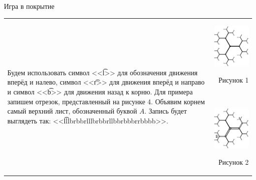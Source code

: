\begin{problem}{Игра в покрытие}
\begin{tabular}{lr}
\begin{minipage}{0.70\thelinewidth}
Будем использовать символ <<\t{l}>> для обозначения движения вперёд и налево,
символ <<\t{r}>> для движения вперёд и направо и
символ <<\t{b}>> для движения назад к корню.
Для примера запишем отрезок, представленный на рисунке 4.
Объявим корнем самый верхний лист, обозначенный буквой $A$.
Запись будет выглядеть так: <<\t{lllbrbbrlllbrbbrllbbrbbbrrbbbb}>>.
\end{minipage}
&
\begin{minipage}{0.27\thelinewidth}
\begin{center}
\vskip -70pt

\includegraphics{covering-game.1.eps}

Рисунок 1

~

\includegraphics{covering-game.2.eps}

Рисунок 2


\end{center}
\end{minipage}
\end{tabular}
\end{problem}
